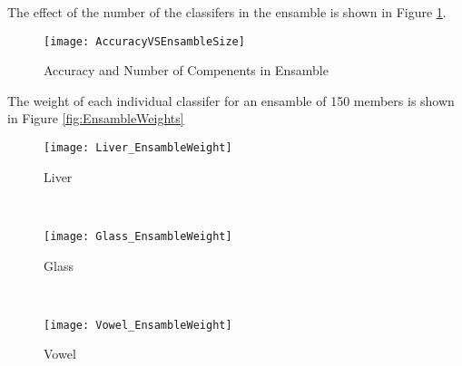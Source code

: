The effect of the number of the classifers in the ensamble is shown in Figure \ref{fig:AccuracyEnsambleSize}.
\begin{figure}[!ht]
    \centering
    \texttt{[image: AccuracyVSEnsambleSize]}
    \caption{Accuracy and Number of Compenents in Ensamble}
    \label{fig:AccuracyEnsambleSize}
\end{figure}
The weight of each individual classifer for an ensamble of 150 members is shown in Figure \ref{fig:EnsambleWeights}
\begin{figure*}[ht!]
	\centering
	\begin{subfigure}[b]{0.3\textwidth}
		\centering
		\texttt{[image: Liver\_EnsambleWeight]}
      \caption{Liver}
	\end{subfigure}%
	~
	\begin{subfigure}[b]{0.3\textwidth}
		\centering
		\texttt{[image: Glass\_EnsambleWeight]}
        \caption{Glass}
	\end{subfigure}	
    ~
	\begin{subfigure}[b]{0.3\textwidth}
		\centering
		\texttt{[image: Vowel\_EnsambleWeight]}
        \caption{Vowel}
	\end{subfigure}%
	\caption{Distribution of Ensamble Weights}
	\label{fig:EnsambleWeights}
\end{figure*}
